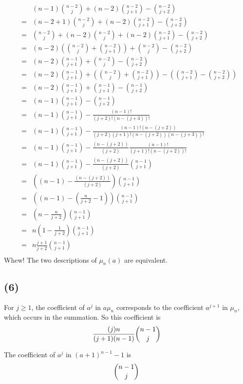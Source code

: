 \documentclass{article}
\begin{document}
\begin{eqnarray*}
& & (n-1)\binom{n-2}{j} + (n-2)\binom{n-2}{j+1} - \binom{n-2}{j+2} \\
&=& (n-2 + 1)\binom{n-2}{j} + (n-2)\binom{n-2}{j+1} - \binom{n-2}{j+2} \\
&=& \binom{n-2}{j} + (n-2)\binom{n-2}{j} + (n-2)\binom{n-2}{j+1} - \binom{n-2}{j+2} \\
&=& (n-2)\left(\binom{n-2}{j} + \binom{n-2}{j+1}\right) + \binom{n-2}{j} - \binom{n-2}{j+2} \\
&=& (n-2)\binom{n-1}{j + 1} + \binom{n-2}{j} - \binom{n-2}{j+2} \\
&=& (n-2)\binom{n-1}{j + 1} + \left( \binom{n-2}{j} + \binom{n-2}{j+1}  \right)-
\left( \binom{n-2}{j+1} - \binom{n-2}{j+2}  \right)\\
&=& (n-2)\binom{n-1}{j + 1} + \binom{n-1}{j+1} - \binom{n-1}{j+2}\\
&=& (n-1)\binom{n-1}{j + 1} - \binom{n-1}{j+2}\\
&=& (n-1)\binom{n-1}{j + 1} - \frac{(n-1)!}{(j+2)!(n-(j+3))!}\\
&=& (n-1)\binom{n-1}{j + 1} - \frac{(n-1)!(n-(j+2))}{(j+2)(j+1)!(n-(j+2))(n-(j+3))!}\\
&=& (n-1)\binom{n-1}{j + 1} - \frac{(n-(j+2))}{(j+2)}\frac{(n-1)!}{(j+1)!(n-(j+2))!}\\
&=& (n-1)\binom{n-1}{j + 1} - \frac{(n-(j+2))}{(j+2)}\binom{n-1}{j+1}\\
&=& \left( (n-1)- \frac{(n-(j+2))}{(j+2)} \right)\binom{n-1}{j+1}\\
&=& \left( (n-1)- \left(\frac{n}{j+2} - 1\right) \right)\binom{n-1}{j+1}\\
&=& \left( n- \frac{n}{j+2} \right)\binom{n-1}{j+1}\\
&=& n\left(1 - \frac{1}{j+2} \right)\binom{n-1}{j+1}\\
&=& n\frac{j+1}{j+2} \binom{n-1}{j+1}\\
\end{eqnarray*}
Whew! The two descriptions of $\mu_n(a)$ are equivalent.
\newpage
\subsection{(6)}
For $j\ge 1$, the coefficient of $a^j$ in $a\mu_n$ corresponds to the coefficient $a^{j+1}$ in $\mu_n$, which occurs in the summation. So this coefficient is \[\dfrac{(j)n}{(j+1)(n-1)} \dbinom{n-1}{j}\] 

The coefficient of $a^j$ in $(a+1)^{n-1}-1$ is 
\[\dbinom{n-1}{j}\]
\end{document}
